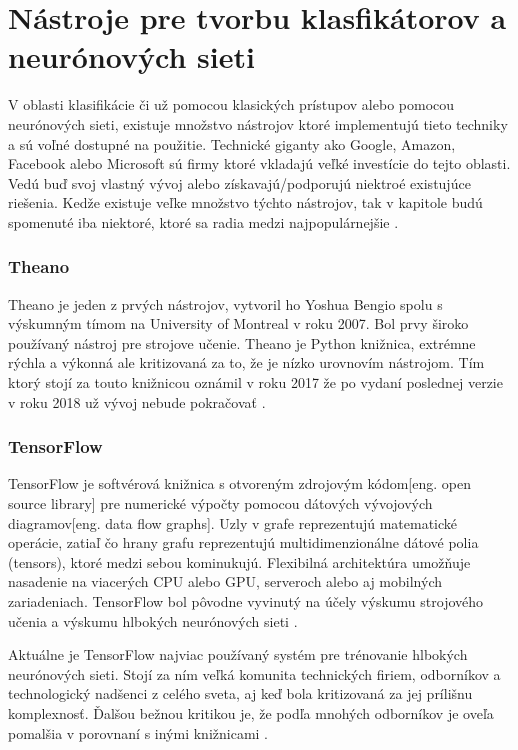 
\section{Nástroje pre tvorbu klasfikátorov a neurónových sieti}

V oblasti klasifikácie či už pomocou klasických prístupov alebo pomocou neurónových sieti, existuje množstvo nástrojov
    ktoré implementujú tieto techniky a sú voľné dostupné na použitie.
Technické giganty ako Google, Amazon, Facebook alebo Microsoft sú firmy ktoré vkladajú veľké investície do tejto oblasti.
Vedú buď svoj vlastný vývoj alebo získavajú/podporujú niektroé existujúce riešenia.
Kedže existuje veľke množstvo týchto nástrojov, tak v kapitole budú spomenuté iba niektoré, ktoré sa radia medzi najpopulárnejšie \cite{odkaz:FrameworkComparison}.

\subsubsection{Theano}

Theano je jeden z prvých nástrojov, vytvoril ho Yoshua Bengio spolu s výskumným tímom na University of Montreal v roku 2007.
Bol prvy široko používaný nástroj pre strojove učenie.
Theano je Python knižnica, extrémne rýchla a výkonná ale kritizovaná za to, že je nízko urovnovím nástrojom.
Tím ktorý stojí za touto knižnicou oznámil v roku 2017 že po vydaní poslednej verzie v roku 2018 už vývoj nebude pokračovať \cite{odkaz:FrameworkComparison}.

\subsubsection{TensorFlow}

TensorFlow je softvérová knižnica s otvoreným zdrojovým kódom[eng. open source library] pre numerické výpočty pomocou dátových vývojových diagramov[eng. data flow graphs].
Uzly v grafe reprezentujú matematické operácie, zatiaľ čo hrany grafu reprezentujú multidimenzionálne dátové polia (tensors), ktoré medzi sebou kominukujú.
Flexibilná architektúra umožňuje nasadenie na viacerých CPU alebo GPU, serveroch alebo aj mobilných zariadeniach.
TensorFlow bol pôvodne vyvinutý na účely výskumu strojového učenia a výskumu hlbokých neurónových sieti \cite{odkaz:TensorFlow}.

Aktuálne je TensorFlow najviac používaný systém pre trénovanie hlbokých neurónových sieti.
Stojí za ním veľká komunita technických firiem, odborníkov a technologický nadšenci z celého sveta, aj keď bola kritizovaná za jej prílišnu komplexnosť.
Ďalšou bežnou kritikou je, že podľa mnohých odborníkov je oveľa pomalšia v porovnaní s inými knižnicami \cite{odkaz:FrameworkComparison}.

